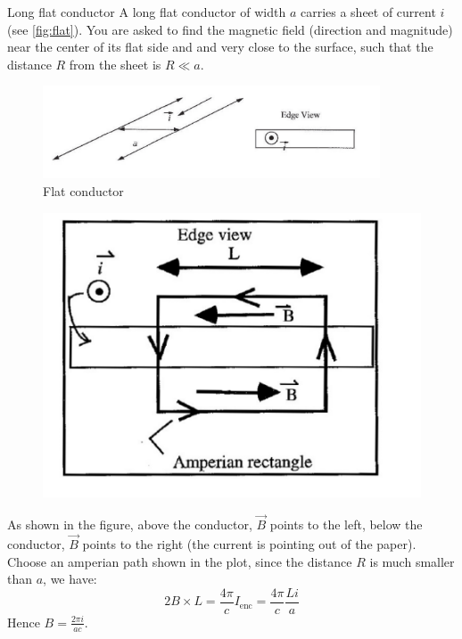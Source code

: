 \documentclass[makesolutionspdf]{esg8022pset}
\begin{document}
\begin{problem}{Long flat conductor}
  A long flat conductor of width $a$ carries a sheet of current $i$ (see
  \autoref{fig:flat}). You are asked to find the magnetic field (direction and
  magnitude) near the center of its flat side and and very close to the
  surface, such that the distance $R$ from the sheet is $R \ll a$.

  \begin{figure}[ht]
    \centering
    \includegraphics[width = 10cm]{flat_conductor}
    \caption{Flat conductor}
    \label{fig:flat}
  \end{figure}

\end{problem}

\begin{solution}

  \begin{figure}[ht]
    \centering
    \includegraphics[width = 12cm]{flat_conductor_sol}
    \label{fig:flatsol}
  \end{figure}

  As shown in the figure, above the conductor, $\vec{B}$ points to the left,
  below the conductor, $\vec{B}$  points to the right (the current is pointing
  out of the paper).  Choose an amperian path shown in the plot, since the
  distance $R$ is much smaller than $a$, we have:
  \begin{equation}
    2B \times L = \frac{4 \pi}{c} I_{\text{enc}} = \frac{4 \pi}{c} \frac{L i}{a}
  \end{equation}
  Hence $B=\frac{2 \pi i}{a c}$.
\end{solution}
\end{document}

